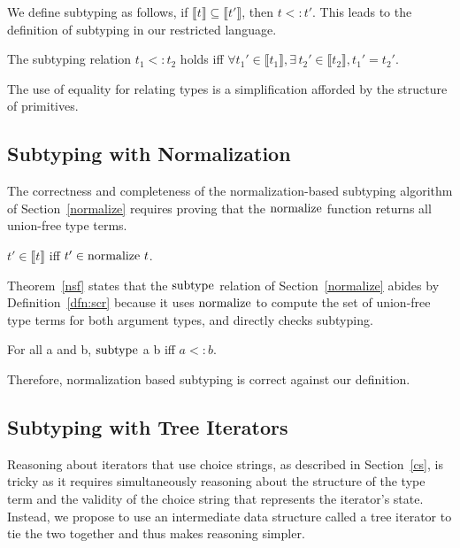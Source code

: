 \documentclass[a4paper,english]{lipics-v2019}
\newcommand{\denotes}[1]{\llbracket #1 \rrbracket}
\renewcommand{\c}[1]{\ensuremath{\text{\lstinline{#1}}}\xspace}
\begin{document}
\noindent
We define subtyping as follows, if $\denotes{t}\subseteq\denotes{t'}$, then
$t<:t'$.  This leads to the definition of subtyping in our restricted language.

\begin{definition}
The subtyping relation $t_1 <: t_2$ holds iff $\forall t_1' \in
\denotes{t_1}, \exists\, t_2' \in \denotes{t_2}, t_1' =
t_2'$.\label{dfn:scr}
\end{definition}

\noindent
The use of equality for relating types is a simplification afforded by the
structure of primitives.

\subsection{Subtyping with Normalization}

The correctness and completeness of the normalization-based subtyping
algorithm of Section~\ref{normalize} requires proving that the \c{normalize}
function returns all union-free type terms.

\begin{lemma}[NF Equivalence]\label{lem:equiv_ndet}
$t' \in \denotes{t}$ iff $t' \in \c{normalize}~ t$.
\end{lemma}

\noindent
Theorem~\ref{nsf} states that the \c{subtype} relation of
Section~\ref{normalize} abides by Definition~\ref{dfn:scr} because it uses
\c{normalize} to compute the set of union-free type terms for both argument
types, and directly checks subtyping.

\begin{theorem}[NF Subtyping]\label{nsf}
For all  a and b, \c{subtype} a b iff $a <: b$.
\end{theorem}

\noindent
Therefore, normalization based subtyping is correct against our definition.


\subsection{Subtyping with Tree Iterators}

Reasoning about iterators that use choice strings, as described in
Section~\ref{cs}, is tricky as it requires simultaneously reasoning about
the structure of the type term and the validity of the choice string that
represents the iterator's state. Instead, we propose to use an intermediate
data structure called a tree iterator to tie the two together and thus makes
reasoning simpler.
\end{document}
